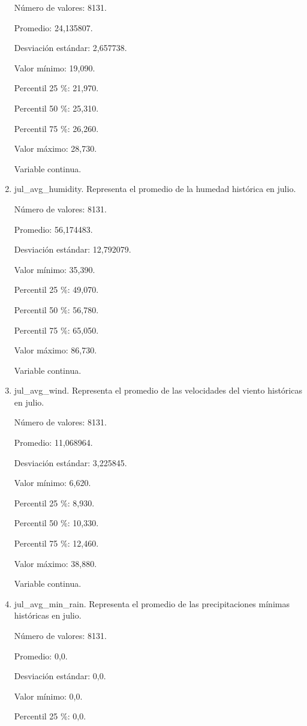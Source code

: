 \begin{enumerate}
	Número de valores: 8131.
	
	Promedio: 24,135807.
	
	Desviación estándar: 2,657738.
	
	Valor mínimo: 19,090.
	
	Percentil 25 \%: 21,970.
	
	Percentil 50 \%: 25,310.
	
	Percentil 75 \%: 26,260.
	
	Valor máximo: 28,730.
	
	Variable continua.

	\item jul\_avg\_humidity. Representa el promedio de la humedad histórica en julio.
	
	Número de valores: 8131.
	
	Promedio: 56,174483.
	
	Desviación estándar: 12,792079.
	
	Valor mínimo: 35,390.
	
	Percentil 25 \%: 49,070.
	
	Percentil 50 \%: 56,780.
	
	Percentil 75 \%: 65,050.
	
	Valor máximo: 86,730.
	
	Variable continua.

	\item jul\_avg\_wind. Representa el promedio de las velocidades del viento históricas en julio.
	
	Número de valores: 8131.
	
	Promedio: 11,068964.
	
	Desviación estándar: 3,225845.
	
	Valor mínimo: 6,620.
	
	Percentil 25 \%: 8,930.
	
	Percentil 50 \%: 10,330.
	
	Percentil 75 \%: 12,460.
	
	Valor máximo: 38,880.
	
	Variable continua.

	\item jul\_avg\_min\_rain. Representa el promedio de las precipitaciones mínimas históricas en julio.
	
	Número de valores: 8131.
	
	Promedio: 0,0.
	
	Desviación estándar: 0,0.
	
	Valor mínimo: 0,0.
	
	Percentil 25 \%: 0,0.
	

\end{enumerate}
